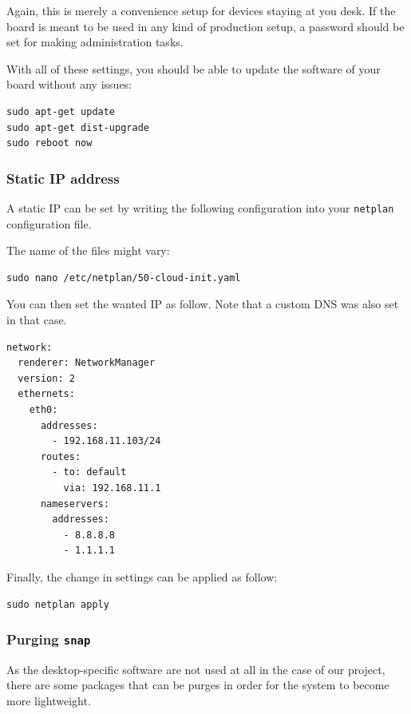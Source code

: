 \documentclass[10pt]{article}
\begin{document}
Again, this is merely a convenience setup for devices staying at you desk. If
the board is meant to be used in any kind of production setup, a password
should be set for making administration tasks.

With all of these settings, you should be able to update the software of your
board without any issues:
\begin{verbatim}
sudo apt-get update
sudo apt-get dist-upgrade
sudo reboot now
\end{verbatim}


\subsubsection{Static IP address}
\label{sec:orge70d0e8}
A static IP can be set by writing the following
configuration into your \texttt{netplan} configuration file.

The name of the files might vary:
\begin{verbatim}
sudo nano /etc/netplan/50-cloud-init.yaml
\end{verbatim}

You can then set the wanted IP as follow. Note that a custom DNS was
also set in that case.
\begin{verbatim}
network:
  renderer: NetworkManager
  version: 2
  ethernets:
    eth0:
      addresses:
        - 192.168.11.103/24
      routes:
        - to: default
          via: 192.168.11.1
      nameservers:
        addresses:
          - 8.8.8.8
          - 1.1.1.1
\end{verbatim}

Finally, the change in settings can be applied
as follow:

\begin{verbatim}
sudo netplan apply
\end{verbatim}

\subsubsection{Purging \texttt{snap}}
\label{sec:org82367e4}
As the desktop-specific software are not used at all in the case
of our project, there are some packages that can be purges in order for the
system to become more lightweight.
\end{document}
